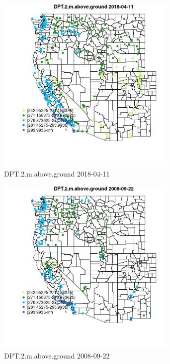 \begin{figure} 
\centering  
\includegraphics[width=0.77\textwidth]{Code_Outputs/Report_ML_input_PM25_Step4_part_e_de_duplicated_aves_compiled_2019-05-18wNAs_MapObsDPT2maboveground2018-04-11.jpg} 
\caption{\label{fig:Report_ML_input_PM25_Step4_part_e_de_duplicated_aves_compiled_2019-05-18wNAsMapObsDPT2maboveground2018-04-11}DPT.2.m.above.ground 2018-04-11} 
\end{figure} 
 

\begin{figure} 
\centering  
\includegraphics[width=0.77\textwidth]{Code_Outputs/Report_ML_input_PM25_Step4_part_e_de_duplicated_aves_compiled_2019-05-18wNAs_MapObsDPT2maboveground2008-09-22.jpg} 
\caption{\label{fig:Report_ML_input_PM25_Step4_part_e_de_duplicated_aves_compiled_2019-05-18wNAsMapObsDPT2maboveground2008-09-22}DPT.2.m.above.ground 2008-09-22} 
\end{figure} 
 

